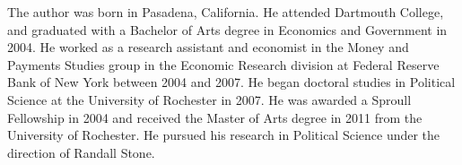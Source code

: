 The author was born in Pasadena, California. 
He attended Dartmouth College, and graduated with a Bachelor of Arts degree in Economics and Government in 2004.
He worked as a research assistant and economist in the Money and Payments Studies group in the Economic Research division at Federal Reserve Bank of New York between 2004 and 2007.
He began doctoral studies in Political Science at the University of Rochester in 2007.
He was awarded a Sproull Fellowship in 2004 and received the Master of Arts degree in 2011 from the University of Rochester.
He pursued his research in Political Science under the direction of Randall Stone.

\bigskip\noindent%

